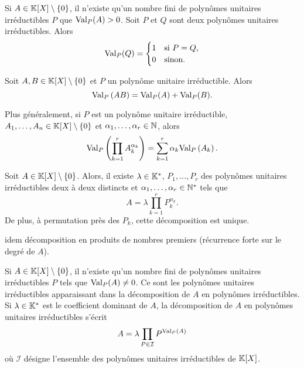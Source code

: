 \documentclass{magnolia}
\begin{document}
\begin{remarques}
\remarque Si $A\in\polyK\setminus\ens{0}$, il n'existe qu'un nombre fini de polynômes unitaires irréductibles
  $P$ que ${\rm Val}_P(A)>0$.
\remarque Soit $P$ et $Q$ sont deux polynômes unitaires irréductibles. Alors
  \[{\rm Val}_P(Q)=\begin{cases}
    1 & \text{si $P=Q$,}\\
    0 & \text{sinon.}
  \end{cases}\]
\end{remarques}

\begin{proposition}
Soit $A,B\in\polyK\setminus\ens{0}$ et $P$ un polynôme unitaire irréductible. Alors
\[{\rm Val}_P\left(AB\right)={\rm Val}_P(A)+{\rm Val}_P(B).\]
\end{proposition}

\begin{remarqueUnique}
\remarque Plus généralement, si $P$ est un polynôme unitaire irréductible, $A_1,\ldots,A_n\in\polyK\setminus\ens{0}$ et $\alpha_1,\ldots,\alpha_r\in\mathbb{N}$, alors
\[{\rm Val}_P\left(\prod_{k=1}^r A_k^{\alpha_k}\right)=\sum_{k=1}^r \alpha_k {\rm Val}_P\left(A_k\right).\]
\end{remarqueUnique}

\begin{proposition}
Soit $A\in\polyK\setminus\ens{0}$. Alors, il existe $\lambda\in\mathbb{K}^*$,
$P_1,\ldots,P_r$ des polynômes unitaires irréductibles deux à deux distincts et
$\alpha_1,\ldots,\alpha_r\in{\mathbb{N}^*}$ tels que
\[A=\lambda \prod_{k=1}^r P_k^{\alpha_k}.\]
De plus, à permutation près des $P_k$, cette décomposition est unique.
\end{proposition}

\begin{preuve}
idem décomposition en produits de nombres premiers (récurrence forte sur le degré de $A$).
\end{preuve}


\begin{remarques}
\remarque Si $A\in\polyK\setminus\ens{0}$, il n'existe qu'un nombre fini de polynômes unitaires irréductibles $P$ tels que
  ${\rm Val}_P(A)\neq 0$. Ce sont les polynômes unitaires irréductibles apparaissant dans la décomposition
  de $A$ en polynômes irréductibles.
\remarque Si $\lambda\in\mathbb{K}^*$ est le coefficient dominant de $A$, la décomposition de $A$ en polynômes
  unitaires irréductibles s'écrit
  \[A=\lambda \prod_{P\in\mathcal{I}} P^{{\rm Val}_P(A)}\]
  où $\mathcal{I}$ désigne l'ensemble des polynômes unitaires irréductibles
  de $\polyK$.
\end{remarques}
\end{document}
